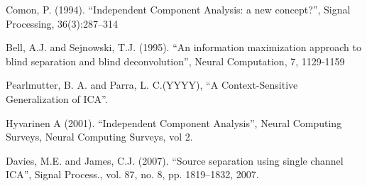 \documentclass[11pt, oneside, a4paper]{article}
\begin{document}
\begin{thebibliography}{99}

 Comon, P. (1994). 
``Independent Component Analysis: a new concept?'', 
Signal Processing, 36(3):287–314

 Bell, A.J. and Sejnowski, T.J. (1995). 
``An information maximization approach to blind separation and blind deconvolution'', 
Neural Computation, 7, 1129-1159

Pearlmutter, B. A. and Parra, L. C.(YYYY),
``A Context-Sensitive Generalization of ICA''. 

Hyvarinen A (2001).
``Independent Component Analysis'',
Neural Computing Surveys, Neural Computing Surveys, vol 2.

  
Davies, M.E. and James, C.J. (2007).
``Source separation using single channel ICA'',
Signal Process., vol. 87, no. 8, pp. 1819–1832, 2007.

\end{thebibliography}
\end{document}
